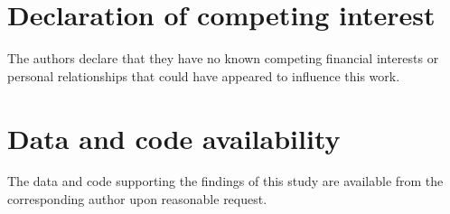 \documentclass[a4paper,fleqn,numbers,doubleblind]{cas-dc}
\begin{document}
\section*{Declaration of competing interest}
The authors declare that they have no known competing financial interests or
personal relationships that could have appeared to influence this work.
\section*{Data and code availability}
The data and code supporting the findings of this study are available from the
corresponding author upon reasonable request.



\end{document}
